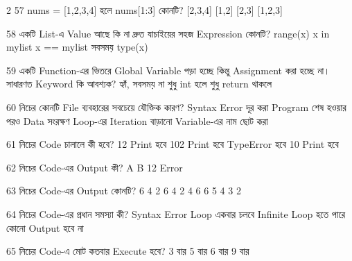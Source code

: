 \begin{multicols}{2}
\mcqwide
{57}
{\textenglish{\ttfamily nums = [1,2,3,4]} হলে \textenglish{\ttfamily nums[1:3]} কোনটি?}
{[2,3,4]}
{[1,2]}
{[2,3]}
{[1,2,3]}

\mcq
{58}
{একটি List-এ Value আছে কি না দ্রুত যাচাইয়ের সহজ Expression কোনটি?}
{range(x)}
{x in mylist}
{x == mylist সবসময়}
{type(x)}

\mcq
{59}
{একটি Function-এর ভিতরে Global Variable পড়া হচ্ছে কিন্তু Assignment করা হচ্ছে না। সাধারণত  Keyword কি আবশ্যক?}
{হ্যাঁ, সবসময়}
{না}
{শুধু int হলে}
{শুধু return থাকলে}

\mcqwide
{60}
{নিচের কোনটি File ব্যবহারের সবচেয়ে যৌক্তিক কারণ?}
{Syntax Error দূর করা}
{Program শেষ হওয়ার পরও Data সংরক্ষণ}
{Loop-এর Iteration বাড়ানো}
{Variable-এর নাম ছোট করা}

\mcqwide
{61}
{নিচের Code চালালে কী হবে?}
{12 Print হবে}
{102 Print হবে}
{TypeError হবে}
{10 Print হবে}

\mcqwide
{62}
{নিচের Code-এর Output কী?}
{A}
{B}
{12}
{Error}

\mcqwide
{63}
{নিচের Code-এর Output কোনটি?}
{6 4 2}
{6 4}
{2 4 6}
{6 5 4 3 2}

\mcqwide
{64}
{নিচের Code-এর প্রধান সমস্যা কী?}
{Syntax Error}
{Loop একবার চলবে}
{Infinite Loop হতে পারে}
{কোনো Output হবে না}

\mcqwide
{65}
{নিচের Code-এ  মোট কতবার Execute হবে?}
{3 বার}
{5 বার}
{6 বার}
{9 বার}


\end{multicols}

